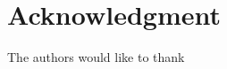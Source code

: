\documentclass[journal, a4paper]{IEEEtran}
\begin{document}
\section*{Acknowledgment}
The authors would like to thank \lipsum[1]



\ifCLASSOPTIONcaptionsoff
  \newpage
\fi






\end{document}
